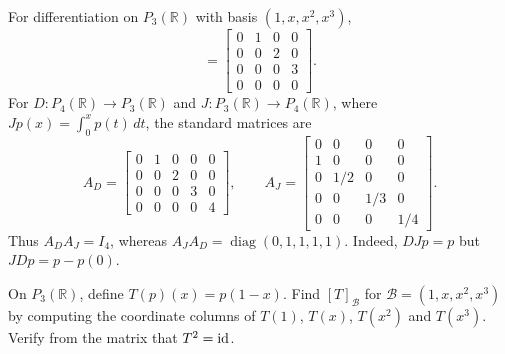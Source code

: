 \begin{Example}
For differentiation on $P_3(\mathbb R)$ with basis $(1,x,x^2,x^3)$,
\begin{equation*}
[D]=\begin{bmatrix}0&1&0&0\\0&0&2&0\\0&0&0&3\\0&0&0&0\end{bmatrix}.
\end{equation*}
For $D\colon P_4(\mathbb R)\to P_3(\mathbb R)$ and $J\colon P_3(\mathbb R)\to P_4(\mathbb R)$, where $Jp(x)=\int_0^x p(t)\,dt$, the standard matrices are
\begin{equation*}
A_D=\begin{bmatrix}0&1&0&0&0\\0&0&2&0&0\\0&0&0&3&0\\0&0&0&0&4\end{bmatrix},\qquad
A_J=\begin{bmatrix}0&0&0&0\\1&0&0&0\\0&1/2&0&0\\0&0&1/3&0\\0&0&0&1/4\end{bmatrix}.
\end{equation*}
Thus $A_DA_J=I_4$, whereas $A_JA_D=\operatorname{diag}(0,1,1,1,1)$. Indeed, $DJp=p$ but $JDp=p-p(0)$.
\end{Example}

\begin{Exercise}
On $P_3(\mathbb R)$, define $T(p)(x)=p(1-x)$. Find $[T]_{\mathcal B}$ for $\mathcal B=(1,x,x^2,x^3)$ by computing the coordinate columns of $T(1)$, $T(x)$, $T(x^2)$ and $T(x^3)$. Verify from the matrix that $T^2=\mathrm{id}$.
\end{Exercise}

